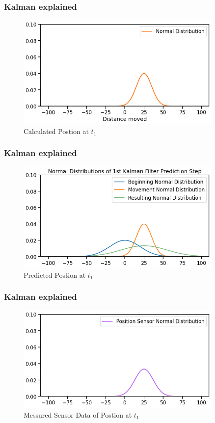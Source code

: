 \documentclass{beamer}
\begin{document}
\begin{frame}
    \frametitle{Kalman explained}
    \begin{figure}
        \centering
        \includegraphics[width=0.9\textwidth]{images/02_normal_distribution_after_move.png}
        \caption{Calculated Postion at \(t_1\)}
    \end{figure}
\end{frame}

\begin{frame}
    \frametitle{Kalman explained}
    \begin{figure}
        \centering
        \includegraphics[width=0.9\textwidth]{images/03_first_prediction.png}
        \caption{Predicted Postion at \(t_1\)}
    \end{figure}
\end{frame}

\begin{frame}
    \frametitle{Kalman explained}
    \begin{figure}
        \centering
        \includegraphics[width=0.9\textwidth]{images/04_measurement.png}
        \caption{Messured Sensor Data of Postion at \(t_1\)}
    \end{figure}
\end{frame}
\end{document}
